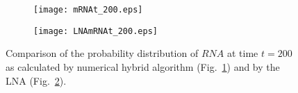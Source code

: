 \documentclass{llncs}
\begin{document}
 \begin{figure}
	\centering
	\begin{subfigure}{.5\textwidth}
     \centering
     \texttt{[image: mRNAt\_200.eps]}
     \caption{}
     \label{fig:sub3}
   \end{subfigure}%
\begin{subfigure}{.5\textwidth}
  \centering
  \texttt{[image: LNAmRNAt\_200.eps]}
  \caption{}
  \label{fig:sub4}
\end{subfigure}
\caption{Comparison of the probability distribution of $RNA$ at time $t=200$ as calculated by numerical hybrid algorithm (Fig.\ \ref{fig:sub3}) and by the LNA (Fig.\ \ref{fig:sub4}).}
\label{Virus}
\vspace{-0.5cm}
\end{figure}%
\end{document}

